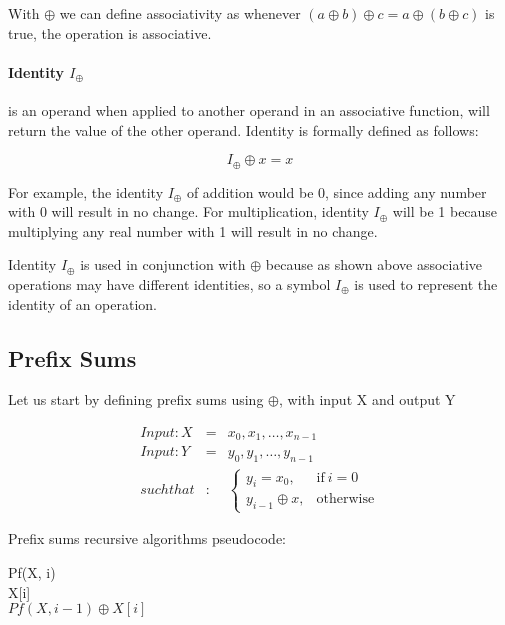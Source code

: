 \documentclass[11pt]{article}
\begin{document}
With $\oplus$ we can define associativity as whenever $(a \oplus b) \oplus c = a \oplus (b \oplus c)$ is true, the operation is associative.

\paragraph{Identity $I_\oplus$} is an operand when applied to another operand in an associative function, will return the value of the other operand. Identity is formally defined as follows:

  \begin{equation}
    I_\oplus \oplus x = x
  \end{equation}

For example, the identity $I_\oplus$ of addition would be 0, since adding any number with 0 will result in no change. For multiplication, identity $I_\oplus$ will be 1 because multiplying any real number with 1 will result in no change.

Identity $I_\oplus$ is used in conjunction with $\oplus$ because as shown above associative operations may have different identities, so a symbol $I_\oplus$ is used to represent the identity of an operation.

\subsection{Prefix Sums}

Let us start by defining prefix sums using $\oplus$, with input X and output Y

  \begin{eqnarray*}
    Input: X &=& {x_0, x_1, \dots , x_{n-1}}\\
    Input: Y &=& {y_0, y_1, \dots , y_{n-1}}\\
    such that&:&
    \begin{cases}
      y_i = x_0, & \text{if}\ i = 0 \\
      y_{i-1} \oplus x, & \text{otherwise}
    \end{cases}
  \end{eqnarray*}

Prefix sums recursive algorithms pseudocode:

\begin{algorithm}
  \begin{algorithmic}[1]
    \State Pf(X, i)
     \\
      \quad\Return X[i]
    \Else \\
      \quad\Return $Pf(X, i - 1) \oplus X[i]$
    \EndIf
  \end{algorithmic}
\end{algorithm}
\end{document}
